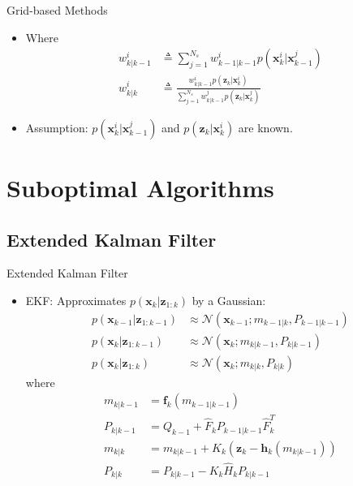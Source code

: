 \documentclass{beamer}
\newcommand{\x}{\mathbf{x}}
\newcommand{\z}{\mathbf{z}}
\begin{document}
\begin{frame}{Grid-based Methods}%
  \begin{itemize}
  	\item{Where 
    	\begin{align*}
        w_{k|k-1}^{i} &\triangleq  \sum_{j=1}^{N_s} w_{k-1|k-1}^{i} p(\x_k^i|\x_{k-1}^j)\\
        w_{k|k}^{i}   &\triangleq \frac{w_{k|k-1}^{i} p(\z_k|\x_{k}^i)}{\sum\limits_{j=1}^{N_s} w_{k|k-1}^{j} p(\z_k|\x_{k}^j)}
    	\end{align*}
  	}
  	\item{ Assumption: $p(\x_k^i|\x_{k-1}^j)$ and $p(\z_k|\x_{k}^i)$ are known.
  	}
  \end{itemize}
\end{frame}

\section{Suboptimal Algorithms}
\subsection{Extended Kalman Filter}

\begin{frame}{Extended Kalman Filter}%
  \begin{itemize}
  	\item {EKF: Approximates $p(\x_k|\z_{1:k})$ by a Gaussian:    
    	\begin{align*}
        p(\mathbf{x}_{k-1}|\mathbf{z}_{1:k-1}) &\approx \mathcal{N}(\mathbf{x}_{k-1}; m_{k-1|k}, P_{k-1|k-1}) \\
        p(\mathbf{x}_{k}|\mathbf{z}_{1:k-1})   &\approx \mathcal{N}(\mathbf{x}_{k}; m_{k|k-1}, P_{k|k-1}) \\
        p(\mathbf{x}_k|\mathbf{z}_{1:k})       &\approx \mathcal{N}(\mathbf{x}_k; m_{k|k}, P_{k|k})
    	\end{align*}    
  	}
where    
    	 \begin{align*}
        m_{k|k-1} &= \mathbf{f}_k(m_{k-1|k-1}) \\
        P_{k|k-1} &= Q_{k-1} + \hat{F}_kP_{k-1|k-1}\hat{F}_k^T \\
        m_{k|k}   &= m_{k|k-1} + K_k(\mathbf{z}_k - \mathbf{h}_k(m_{k|k-1})) \\
        P_{k|k}   &= P_{k|k-1} - K_k\hat{H}_kP_{k|k-1}
    	\end{align*}
  \end{itemize}
\end{frame}
\end{document}
